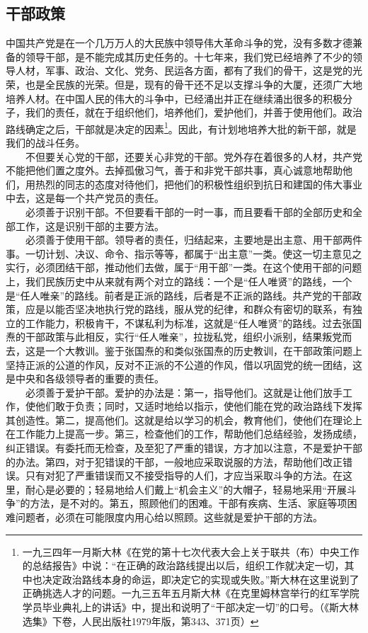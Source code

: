 \documentclass[cn,11pt,chinese]{elegantbook}
\def\myformat#1{\hfil\hfil #1}
\begin{document}
\subsection*{\myformat{干部政策}}
中国共产党是在一个几万万人的大民族中领导伟大革命斗争的党，没有多数才德兼备的领导干部，是不能完成其历史任务的。十七年来，我们党已经培养了不少的领导人材，军事、政治、文化、党务、民运各方面，都有了我们的骨干，这是党的光荣，也是全民族的光荣。但是，现有的骨干还不足以支撑斗争的大厦，还须广大地培养人材。在中国人民的伟大的斗争中，已经涌出并正在继续涌出很多的积极分子，我们的责任，就在于组织他们，培养他们，爱护他们，并善于使用他们。政治路线确定之后，干部就是决定的因素\footnote[4]{ 一九三四年一月斯大林《在党的第十七次代表大会上关于联共（布）中央工作的总结报告》中说：“在正确的政治路线提出以后，组织工作就决定一切，其中也决定政治路线本身的命运，即决定它的实现或失败。”斯大林在这里说到了正确挑选人才的问题。一九三五年五月斯大林《在克里姆林宫举行的红军学院学员毕业典礼上的讲话》中，提出和说明了“干部决定一切”的口号。（《斯大林选集》下卷，人民出版社1979年版，第343、371页）}。因此，有计划地培养大批的新干部，就是我们的战斗任务。\\
　　不但要关心党的干部，还要关心非党的干部。党外存在着很多的人材，共产党不能把他们置之度外。去掉孤傲习气，善于和非党干部共事，真心诚意地帮助他们，用热烈的同志的态度对待他们，把他们的积极性组织到抗日和建国的伟大事业中去，这是每一个共产党员的责任。\\
　　必须善于识别干部。不但要看干部的一时一事，而且要看干部的全部历史和全部工作，这是识别干部的主要方法。\\
　　必须善于使用干部。领导者的责任，归结起来，主要地是出主意、用干部两件事。一切计划、决议、命令、指示等等，都属于“出主意”一类。使这一切主意见之实行，必须团结干部，推动他们去做，属于“用干部”一类。在这个使用干部的问题上，我们民族历史中从来就有两个对立的路线：一个是“任人唯贤”的路线，一个是“任人唯亲”的路线。前者是正派的路线，后者是不正派的路线。共产党的干部政策，应是以能否坚决地执行党的路线，服从党的纪律，和群众有密切的联系，有独立的工作能力，积极肯干，不谋私利为标准，这就是“任人唯贤”的路线。过去张国焘的干部政策与此相反，实行“任人唯亲”，拉拢私党，组织小派别，结果叛党而去，这是一个大教训。鉴于张国焘的和类似张国焘的历史教训，在干部政策问题上坚持正派的公道的作风，反对不正派的不公道的作风，借以巩固党的统一团结，这是中央和各级领导者的重要的责任。\\
　　必须善于爱护干部。爱护的办法是：第一，指导他们。这就是让他们放手工作，使他们敢于负责；同时，又适时地给以指示，使他们能在党的政治路线下发挥其创造性。第二，提高他们。这就是给以学习的机会，教育他们，使他们在理论上在工作能力上提高一步。第三，检查他们的工作，帮助他们总结经验，发扬成绩，纠正错误。有委托而无检查，及至犯了严重的错误，方才加以注意，不是爱护干部的办法。第四，对于犯错误的干部，一般地应采取说服的方法，帮助他们改正错误。只有对犯了严重错误而又不接受指导的人们，才应当采取斗争的方法。在这里，耐心是必要的；轻易地给人们戴上“机会主义”的大帽子，轻易地采用“开展斗争”的方法，是不对的。第五，照顾他们的困难。干部有疾病、生活、家庭等项困难问题者，必须在可能限度内用心给以照顾。这些就是爱护干部的方法。\\
\end{document}
